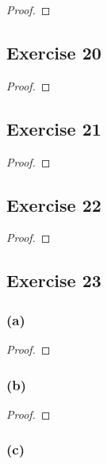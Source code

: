 \documentclass[14pt]{extarticle}
\begin{document}
\begin{proof}

\end{proof}

\subsection{Exercise 20}

\begin{proof}

\end{proof}

\subsection{Exercise 21}

\begin{proof}

\end{proof}

\subsection{Exercise 22}

\begin{proof}

\end{proof}

\subsection{Exercise 23}

\subsubsection{(a)}

\begin{proof}

\end{proof}

\subsubsection{(b)}

\begin{proof}

\end{proof}

\subsubsection{(c)}
\end{document}
